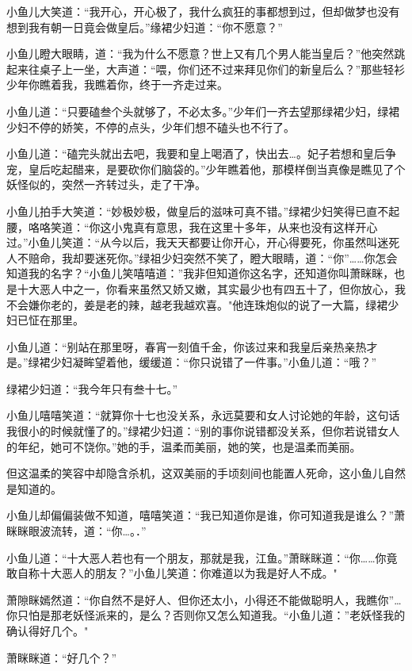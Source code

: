 \documentclass[12pt,oneside]{book}
\begin{document}
小鱼儿大笑道：``我开心，开心极了，我什么疯狂的事都想到过，但却做梦也没有想到我有朝一日竟会做皇后。''缘裙少妇道：``你不愿意？''

小鱼儿瞪大眼睛，道：``我为什么不愿意？世上又有几个男人能当皇后？''他突然跳起来往桌子上一坐，大声道：``喂，你们还不过来拜见你们的新皇后么？''那些轻衫少年你瞧着我，我瞧着你，终于一齐走过来。

小鱼儿道：``只要磕叁个头就够了，不必太多。''少年们一齐去望那绿裙少妇，绿裙少妇不停的娇笑，不停的点头，少年们想不磕头也不行了。

小鱼儿道：``磕完头就出去吧，我要和皇上喝酒了，快出去\ldots。妃子若想和皇后争宠，皇后吃起醋来，是要砍你们脑袋的。''少年瞧着他，那模样倒当真像是瞧见了个妖怪似的，突然一齐转过头，走了干净。

小鱼儿拍手大笑道：``妙极妙极，做皇后的滋味可真不错。''绿裙少妇笑得已直不起腰，咯咯笑道：``你这小鬼真有意思，我在这里十多年，从来也没有这样开心过。''小鱼儿笑道：``从今以后，我天天都要让你开心，开心得要死，你虽然叫迷死人不赔命，我却要迷死你。''绿祖少妇突然不笑了，瞪大眼睛，道：``你''\ldots\ldots 你怎会知道我的名字？``小鱼儿笑嘻嘻道：''我非但知道你这名字，还知道你叫萧眯眯，也是十大恶人中之一，你看来虽然又娇又嫩，其实最少也有四五十了，但你放心，我不会嫌你老的，姜是老的辣，越老我越欢喜。"他连珠炮似的说了一大篇，绿裙少妇已怔在那里。

小鱼儿道：``别站在那里呀，春宵一刻值千金，你该过来和我皇后亲热亲热才是。''绿裙少妇凝眸望着他，缓缓道：``你只说错了一件事。''小鱼儿道：``哦？''

绿裙少妇道：``我今年只有叁十七。''

小鱼儿嘻嘻笑道：``就算你十七也没关系，永远莫要和女人讨论她的年龄，这句话我很小的时候就懂了的。''绿裙少妇道：``别的事你说错都没关系，但你若说错女人的年纪，她可不饶你。''她的手，温柔而美丽，她的笑，也是温柔而美丽。

但这温柔的笑容中却隐含杀机，这双美丽的手顷刻间也能置人死命，这小鱼儿自然是知道的。

小鱼儿却偏偏装做不知道，嘻嘻笑道：``我已知道你是谁，你可知道我是谁么？''萧眯眯眼波流转，道：``你\ldots。．''

小鱼儿道：``十大恶人若也有一个朋友，那就是我，江鱼。''萧眯眯道：``你\ldots\ldots 你竟敢自称十大恶人的朋友？''小鱼儿笑道：你难道以为我是好人不成。"

萧隙眯嫣然道：``你自然不是好人、但你还太小，小得还不能做聪明人，我瞧你''\ldots 你只怕是那老妖怪派来的，是么？否则你又怎么知道我。``小鱼儿道：''老妖怪我的确认得好几个。"

萧眯眯道：``好几个？''
\end{document}
